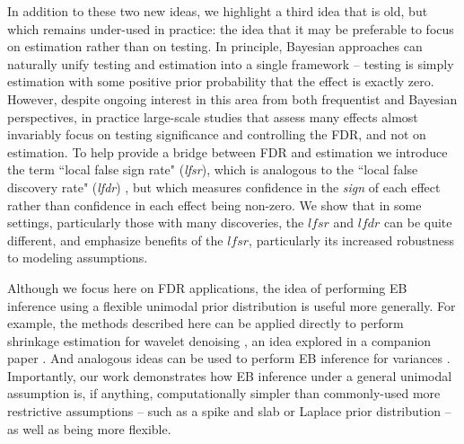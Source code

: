 \documentclass[11pt]{article}
\def\lfdr{\textit{lfdr}}
\def\lfsr{\textit{lfsr}}
\begin{document}
In addition to these two new ideas, we highlight a third idea that is old, but which remains under-used in practice:
the idea that it may be preferable to focus on estimation rather than on testing.
In principle, Bayesian approaches can naturally unify testing and estimation into a single framework -- testing is
simply estimation with some positive prior probability that the effect is exactly zero.
However, despite ongoing interest in this area from both frequentist \cite{benjamini2005false} and Bayesian \cite{zhao2012empirical,gelman2012we} 
perspectives, in practice large-scale studies that assess many effects almost invariably focus on testing significance and
controlling the FDR, and not on estimation. To help provide a bridge between FDR and estimation we introduce the term
``local false sign rate" (\lfsr), which is analogous to the ``local false discovery rate" (\lfdr) \cite{efron2008microarrays}, but which measures confidence  
in the {\it sign} of each effect rather than confidence in each effect being non-zero. We show that in some settings, particularly those with many discoveries, 
the $\lfsr$ and $\lfdr$ can be quite different, and emphasize benefits of the $\lfsr$, particularly its increased robustness to modeling assumptions. 



Although we focus here on FDR applications, the idea of performing EB inference using a flexible unimodal prior distribution
is useful more generally. For example, the methods described here can be applied directly to perform shrinkage estimation for
wavelet denoising \cite{donoho:1995}, an idea explored in a companion paper \cite{xing:2016}. And analogous ideas can be used to perform
EB inference for variances \cite{lu2016variance}.
Importantly, our work demonstrates how EB inference under a general unimodal assumption is, if anything, computationally simpler  
than commonly-used more restrictive assumptions -- such as a spike and slab or Laplace prior distribution \cite{johnstone2004needles} --  as well as being more flexible.
\end{document}
